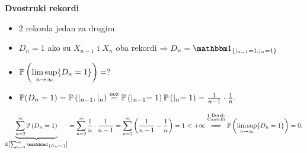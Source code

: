 \documentclass{article}
\newcommand{\mylimsup}{\underset{n\to\infty}{\lim\sup}}
\begin{document}
\textbf{Dvostruki rekordi}
\begin{itemize}
    \item[\ding{228}]\(2\) rekorda jedan za drugim
    \item[\ding{228}]\(D_n=1\) ako su \(X_{n-1}\) i \(X_n\) oba rekordi \(\Rightarrow D_n=\mathbbm 1_{\left\{\mid_{n-1}=1,\mid_n=1\right\}}\) 
    \item[\ding{228}]\(\Bbb P\left(\mylimsup \{D_n=1\}\right)=?\)
    \item[\ding{228}]\(\Bbb P(D_n=1)=\Bbb P\left(\mid_{n-1},\mid_n\right)\overset{\text{nez}}{=}\Bbb P\left(\mid_{n-1}=1\right)\Bbb P\left(\mid_n=1\right)=\frac1{n-1}\cdot\frac1n.\)
\end{itemize}
\[\underbrace{\sum_{n=2}^\infty\Bbb P\left(D_n=1\right)}_{\Bbb E\left[\sum_{n=2}^\infty\mathbbm 1_{\{D_n=1\}}\right]}=\sum_{n=2}^\infty\frac1n\cdot\frac1{n-1}=\sum_{n=2}^\infty\left(\frac1{n-1}-\frac1n\right)=1<+\infty\overset{\substack{1\text{ Borel-}\\\text{Cantelli}\\\text{}}}{\Longrightarrow}\Bbb P\left(\mylimsup \{D_n=1\}\right)=0.\]
\newpage 
\end{document}
